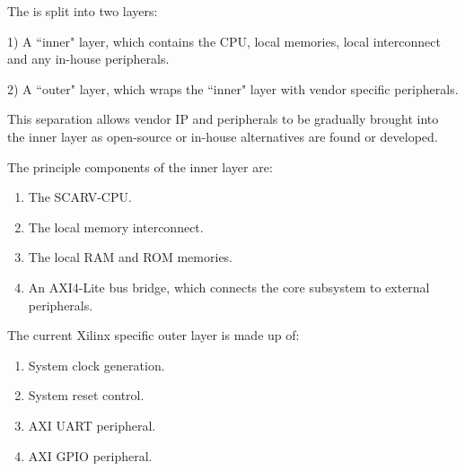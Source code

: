 
The \SCARVSOC is split into two layers:

1) A ``inner" layer, which contains the CPU, local memories, local
   interconnect and any in-house peripherals.

2) A ``outer" layer, which wraps the ``inner" layer with vendor specific
   peripherals.

This separation allows vendor IP and peripherals to be gradually brought
into the inner layer as open-source or in-house alternatives are
found or developed.



\noindent The principle components of the inner layer are:

\begin{enumerate}
\item The SCARV-CPU.
\item The local memory interconnect.
\item The local RAM and ROM memories.
\item An AXI4-Lite bus bridge, which connects the core subsystem to
      external peripherals.
\end{enumerate}


\noindent The current Xilinx specific outer layer is made up of:

\begin{enumerate}
\item System clock generation.
\item System reset control.
\item AXI UART peripheral.
\item AXI GPIO peripheral.
\end{enumerate}

